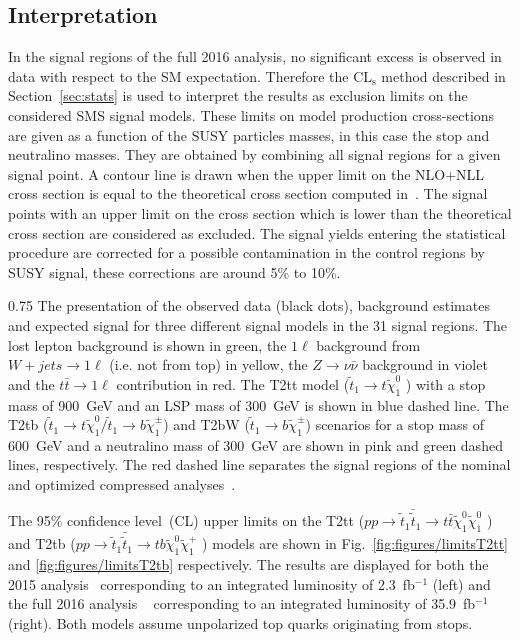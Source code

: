 \subsection{Interpretation}

In the signal regions of the full 2016 analysis, no significant excess is observed in data with respect to the SM expectation.  Therefore the $\mathrm{CL_{s}}$ method described in Section~\ref{sec:stats} is used to interpret the results as exclusion limits on the considered SMS signal models. These limits on model production cross-sections are given as a function of the SUSY particles masses, in this case the stop and neutralino masses. They are obtained by combining all signal regions for a given signal point. A contour line is drawn when the upper limit on the NLO+NLL cross section is equal to the theoretical cross section computed in~\cite{Borschensky:2014cia}. The signal points with an upper limit on the cross section which is lower than the theoretical cross section are considered as excluded. The signal yields entering the statistical procedure are corrected for a possible contamination in the control regions by SUSY signal, these corrections are around 5\% to 10\%.



                 {0.75}       %
                 { The presentation of the observed data (black dots), background estimates and expected signal for three different signal models in the 31 signal regions. The lost lepton background is shown in green, the $1 \ell$ background from $W+jets \to 1\ell$ (i.e. not from top) in yellow, the $Z \to \nu \bar{\nu}$ background in violet and the $t\bar{t} \to 1\ell$ contribution in red. The T2tt model ($\tilde{t}_{1} \to t \tilde{\chi}^{0}_{1}$ ) with a stop mass of 900~GeV and an LSP mass of 300~GeV is shown in blue dashed line. The T2tb ($\tilde{t}_{1} \to t \tilde{\chi}^{0}_{1} /\tilde{t}_{1} \to b \tilde{\chi}^{\pm}_{1}$) and T2bW ($\tilde{t}_{1} \to b \tilde{\chi}^{\pm}_{1}$) scenarios for a stop mass of 600~GeV and a neutralino mass of 300~GeV are shown in pink and green dashed lines, respectively. The red dashed line separates the signal regions of the nominal and optimized compressed analyses~\cite{Sirunyan:2017xse}. }

The 95\% confidence level~(CL) upper limits  on the  T2tt ($ pp \to \tilde{t}_{1} \bar{\tilde{t}}_{1} \to t \bar{t} \tilde{\chi}^{0}_{1} \tilde{\chi}^{0}_{1}$ )  and T2tb ($ pp \to \tilde{t}_{1} \bar{\tilde{t}}_{1} \to t b \tilde{\chi}^{0}_{1} \tilde{\chi}^{+}_{1}$ ) models are shown in Fig.~\ref{fig:figures/limitsT2tt} and \ref{fig:figures/limitsT2tb} respectively. The  results are displayed for both the 2015 analysis~\cite{Sirunyan:2016jpr} corresponding to an integrated luminosity of 2.3~fb$^{-1}$  (left) and the full 2016 analysis ~\cite{Sirunyan:2017xse} corresponding to an integrated luminosity of 35.9~fb$^{-1}$  (right). Both models assume unpolarized top quarks originating from stops.  

